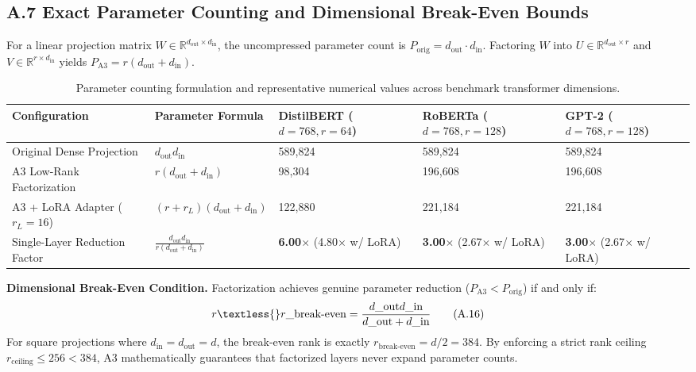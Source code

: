 \subsection{A.7 Exact Parameter Counting and Dimensional Break-Even Bounds}
\label{sec:app_parameter_counting}

For a linear projection matrix $W \in \mathbb{R}^{d_\text{out} \times d_\text{in}}$, the uncompressed parameter count is $P_\text{orig} = d_\text{out} \cdot d_\text{in}$. Factoring $W$ into $U \in \mathbb{R}^{d_\text{out} \times r}$ and $V \in \mathbb{R}^{r \times d_\text{in}}$ yields $P_\text{A3} = r(d_\text{out} + d_\text{in})$.

\begin{table}[H]
\centering
\small
\begin{tabular}{lllll}
\toprule
\textbf{Configuration} & \textbf{Parameter Formula} & \textbf{DistilBERT ($d=768, r=64$)} & \textbf{RoBERTa ($d=768, r=128$)} & \textbf{GPT-2 ($d=768, r=128$)} \\
\midrule
Original Dense Projection & $d_\text{out} d_\text{in}$ & 589,824 & 589,824 & 589,824 \\
A3 Low-Rank Factorization & $r(d_\text{out} + d_\text{in})$ & 98,304 & 196,608 & 196,608 \\
A3 + LoRA Adapter ($r_L=16$) & $(r + r_L)(d_\text{out} + d_\text{in})$ & 122,880 & 221,184 & 221,184 \\
Single-Layer Reduction Factor & $\frac{d_\text{out} d_\text{in}}{r(d_\text{out} + d_\text{in})}$ & \textbf{6.00$\times$} (4.80$\times$ w/ LoRA) & \textbf{3.00$\times$} (2.67$\times$ w/ LoRA) & \textbf{3.00$\times$} (2.67$\times$ w/ LoRA) \\
\bottomrule
\end{tabular}
\caption{Parameter counting formulation and representative numerical values across benchmark transformer dimensions.}
\label{tab:parameter_counting_formulation}
\end{table}

\textbf{Dimensional Break-Even Condition.} Factorization achieves genuine parameter reduction ($P_\text{A3} < P_\text{orig}$) if and only if:
\[
r \textless{} r\_\text{break-even} = \frac{d\_\text{out} d\_\text{in}}{d\_\text{out} + d\_\text{in}}
\tag{A.16}
\]
For square projections where $d_\text{in} = d_\text{out} = d$, the break-even rank is exactly $r_\text{break-even} = d/2 = 384$. By enforcing a strict rank ceiling $r_{\mathrm{ceiling}} \le 256 < 384$, A3 mathematically guarantees that factorized layers never expand parameter counts.

